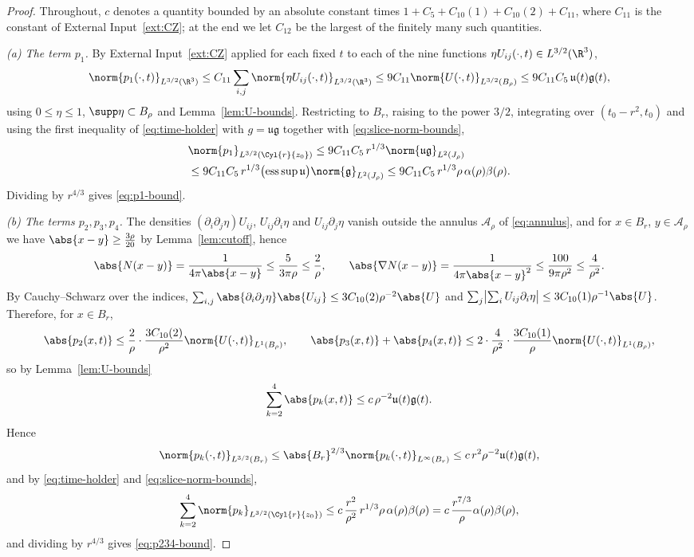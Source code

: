 \documentclass[11pt,reqno]{amsart}
\begin{document}
\begin{proof}
Throughout, $c$ denotes a quantity bounded by an absolute constant times
$1+C_{5}+C_{10}(1)+C_{10}(2)+C_{11}$, where $C_{11}$ is the constant of
External Input~\ref{ext:CZ}; at the end we let $C_{12}$ be the largest of the
finitely many such quantities.

\emph{(a) The term $p_{1}$.} By External Input~\ref{ext:CZ} applied for each
fixed $t$ to each of the nine functions $\eta U_{ij}(\cdot,t)\in L^{3/2}(\R^{3})$,
\[
  \norm{p_{1}(\cdot,t)}_{L^{3/2}(\R^{3})}
  \le C_{11}\sum_{i,j}\norm{\eta U_{ij}(\cdot,t)}_{L^{3/2}(\R^{3})}
  \le 9C_{11}\norm{U(\cdot,t)}_{L^{3/2}(B_{\rho})}
  \le 9C_{11}C_{5}\,\mathfrak{u}(t)\mathfrak{g}(t),
\]
using $0\le\eta\le1$, $\supp\eta\subset B_{\rho}$ and
Lemma~\ref{lem:U-bounds}. Restricting to $B_{r}$, raising to the power $3/2$,
integrating over $(t_{0}-r^{2},t_{0})$ and using the first inequality of
\eqref{eq:time-holder} with $g=\mathfrak{u}\mathfrak{g}$ together with
\eqref{eq:slice-norm-bounds},
\[\begin{aligned}
  &\norm{p_{1}}_{L^{3/2}(\Cyl{r}{z_{0}})}
  \le 9C_{11}C_{5}\,r^{1/3}\norm{\mathfrak{u}\mathfrak{g}}_{L^{2}(J_{\rho})}
  \\ &\le 9C_{11}C_{5}\,r^{1/3}\bigl(\operatorname*{ess\,sup}\mathfrak{u}\bigr)
      \norm{\mathfrak{g}}_{L^{2}(J_{\rho})}
  \le 9C_{11}C_{5}\,r^{1/3}\rho\,\alpha(\rho)\beta(\rho).
\end{aligned}\]
Dividing by $r^{4/3}$ gives \eqref{eq:p1-bound}.

\emph{(b) The terms $p_{2},p_{3},p_{4}$.} The densities
$(\partial_{i}\partial_{j}\eta)U_{ij}$, $U_{ij}\partial_{i}\eta$ and
$U_{ij}\partial_{j}\eta$ vanish outside the annulus $\mathcal{A}_{\rho}$ of
\eqref{eq:annulus}, and for $x\in B_{r}$, $y\in\mathcal{A}_{\rho}$ we have
$\abs{x-y}\ge\tfrac{3\rho}{20}$ by Lemma~\ref{lem:cutoff}, hence
\[
  \abs{N(x-y)}=\frac{1}{4\pi\abs{x-y}}\le\frac{5}{3\pi\rho}\le\frac2\rho,
  \qquad
  \abs{\nabla N(x-y)}=\frac{1}{4\pi\abs{x-y}^{2}}
    \le\frac{100}{9\pi\rho^{2}}\le\frac4{\rho^{2}} .
\]
By Cauchy--Schwarz over the indices,
$\sum_{i,j}\abs{\partial_{i}\partial_{j}\eta}\abs{U_{ij}}\le3C_{10}(2)\rho^{-2}\abs{U}$
and $\sum_{j}\bigl|\sum_{i}U_{ij}\partial_{i}\eta\bigr|
 \le3C_{10}(1)\rho^{-1}\abs{U}$. Therefore, for $x\in B_{r}$,
\[
  \abs{p_{2}(x,t)}\le\frac2\rho\cdot\frac{3C_{10}(2)}{\rho^{2}}
     \norm{U(\cdot,t)}_{L^{1}(B_{\rho})},
  \qquad
  \abs{p_{3}(x,t)}+\abs{p_{4}(x,t)}\le2\cdot\frac{4}{\rho^{2}}\cdot
     \frac{3C_{10}(1)}{\rho}\norm{U(\cdot,t)}_{L^{1}(B_{\rho})} ,
\]
so by Lemma~\ref{lem:U-bounds}
\[
\sum_{k=2}^{4}\abs{p_{k}(x,t)}\le c\,\rho^{-2}\mathfrak{u}(t)\mathfrak{g}(t)
.
\]
Hence
\[
\norm{p_{k}(\cdot,t)}_{L^{3/2}(B_{r})}\le\abs{B_{r}}^{2/3}
 \norm{p_{k}(\cdot,t)}_{L^{\infty}(B_{r})}
 \le c\,r^{2}\rho^{-2}\mathfrak{u}(t)\mathfrak{g}(t)
,
\] and by
\eqref{eq:time-holder} and \eqref{eq:slice-norm-bounds},
\[
  \sum_{k=2}^{4}\norm{p_{k}}_{L^{3/2}(\Cyl{r}{z_{0}})}
  \le c\,\frac{r^{2}}{\rho^{2}}\,r^{1/3}\rho\,\alpha(\rho)\beta(\rho)
  = c\,\frac{r^{7/3}}{\rho}\alpha(\rho)\beta(\rho),
\]
and dividing by $r^{4/3}$ gives \eqref{eq:p234-bound}.


\end{proof}
\end{document}
